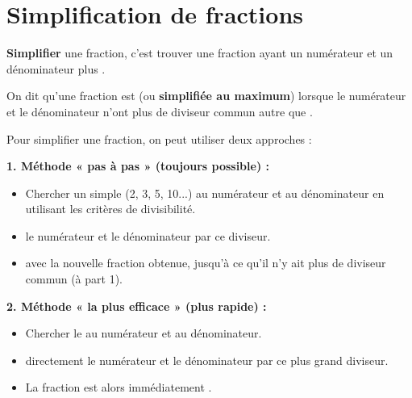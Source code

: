 \section{Simplification de fractions}

\begin{definitionbox}
	\textbf{Simplifier} une fraction, c'est trouver une fraction  ayant un numérateur et un dénominateur plus .

	On dit qu'une fraction est \textbf{} (ou \textbf{simplifiée au maximum}) lorsque le numérateur et le dénominateur n'ont plus de diviseur commun autre que .
\end{definitionbox}

\begin{methodebox}
	Pour simplifier une fraction, on peut utiliser deux approches :

	\textbf{1. Méthode « pas à pas » (toujours possible) :}
	\begin{itemize}
		\item Chercher un  simple (2, 3, 5, 10...) au numérateur et au dénominateur en utilisant les critères de divisibilité.
		\item {} le numérateur et le dénominateur par ce diviseur.
		\item {} avec la nouvelle fraction obtenue, jusqu'à ce qu'il n'y ait plus de diviseur commun (à part 1).
	\end{itemize}

	\textbf{2. Méthode « la plus efficace » (plus rapide) :}
	\begin{itemize}
		\item Chercher le  au numérateur et au dénominateur.
		\item {} directement le numérateur et le dénominateur par ce plus grand diviseur.
		\item La fraction est alors immédiatement .
	\end{itemize}
\end{methodebox}

